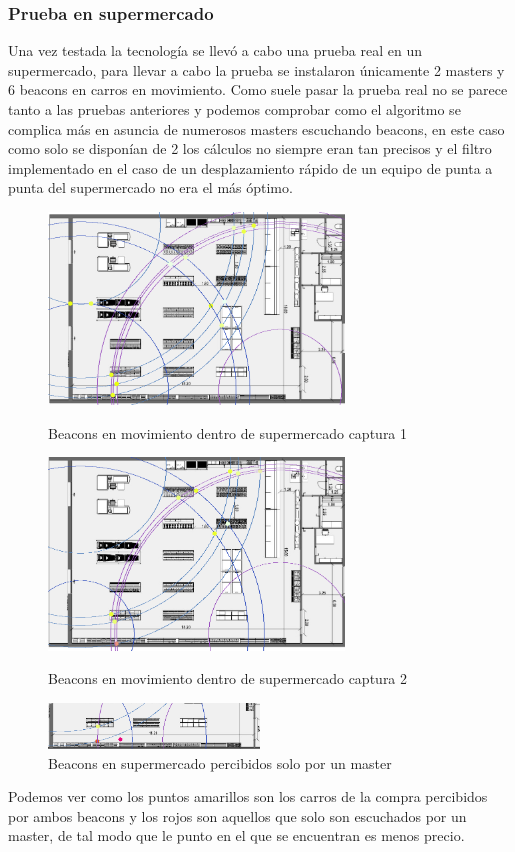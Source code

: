 \documentclass[a4paper ,12pt, onecolumn]{article}
\begin{document}
        \subsubsection{Prueba en supermercado}
            Una vez testada la tecnología se llevó a cabo una prueba real en un supermercado, para llevar a cabo la prueba
            se instalaron únicamente 2 masters y 6 beacons en carros en movimiento.
            Como suele pasar la prueba real no se parece tanto a las pruebas anteriores y podemos comprobar como 
            el algoritmo se complica más en asuncia de numerosos masters escuchando beacons, en este caso como solo se disponían
            de 2 los cálculos no siempre eran tan precisos y el filtro implementado en el caso de un desplazamiento rápido de un 
            equipo de punta a punta del supermercado no era el más óptimo.
            \begin{center}
                \begin{figure}[]
                    \centering
                    \includegraphics[width=0.7\textwidth]{../../Memmory/images/agrupation_3.PNG}
                    \caption{Beacons en movimiento dentro de supermercado captura 1}
                    \includegraphics[width=0.7\textwidth]{../../Memmory/images/agrupation_2.PNG}
                    \caption{Beacons en movimiento dentro de supermercado captura 2}
                    \includegraphics[width=0.5\textwidth]{../../Memmory/images/agrupation_1.PNG}
                    \caption{Beacons en supermercado percibidos solo por un master}
                    \label{fig:mesh11}
                \end{figure}
            \end{center}   
            
            Podemos ver como los puntos amarillos son los carros de la compra percibidos por ambos beacons y los rojos son aquellos
            que solo son escuchados por un master, de tal modo que le punto en el que se encuentran es menos precio.
\end{document}
